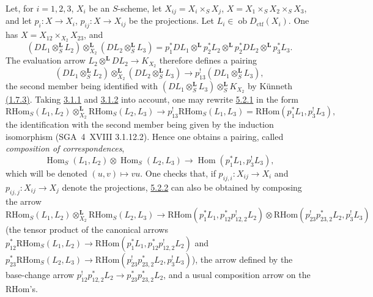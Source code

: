 \documentclass[11pt]{article}
\DeclareMathOperator{\Hom}{Hom}
\providecommand{\RHom}{\mathrm{RHom}}
\providecommand{\RHom}{\mathrm{RHom}}
\providecommand{\Hom}{\operatorname{Hom}}
\providecommand{\RHom}{\mathrm R\mathcal{H}om}
\providecommand{\RHom}{\mathrm{RHom}}
\providecommand{\Hom}{\operatorname{Hom}}
\begin{document}
Let, for $i=1,2,3$, $X_i$ be an $S$-scheme, let $X_{ij}=X_i\times_SX_j$, $X=X_1\times_SX_2\times_SX_3$, and let $p_i:X\to X_i$, $p_{ij}:X\to X_{ij}$ be the projections. Let $L_i\in\operatorname{ob}D_{\mathrm{ctf}}(X_i)$. One has $X=X_{12}\times_{X_2}X_{23}$, and
\[
(DL_1\otimes_S^{\mathbf L}L_2)\otimes_{X_2}^{\mathbf L}(DL_2\otimes_S^{\mathbf L}L_3)
=p_1^*DL_1\otimes^{\mathbf L}p_2^*L_2\otimes^{\mathbf L}p_2^*DL_2\otimes^{\mathbf L}p_3^*L_3.
\]
The evaluation arrow $L_2\otimes^{\mathbf L}DL_2\to K_{X_2}$ therefore defines a pairing
\begin{equation}
\tag{5.2.1}\label{sga5:III:equation:5.2.1}
(DL_1\otimes_S^{\mathbf L}L_2)\otimes_{X_2}^{\mathbf L}(DL_2\otimes_S^{\mathbf L}L_3)\longrightarrow p_{13}^!(DL_1\otimes_S^{\mathbf L}L_3),
\end{equation}
the second member being identified with $(DL_1\otimes_S^{\mathbf L}L_3)\otimes_S^{\mathbf L}K_{X_2}$ by Künneth \hyperref[sga5:III:equation:1.7.3]{(1.7.3)}. Taking \hyperref[sga5:III:equation:3.1.1]{3.1.1} and \hyperref[sga5:III:equation:3.1.2]{3.1.2} into account, one may rewrite \hyperref[sga5:III:equation:5.2.1]{5.2.1} in the form
\begin{equation}
\tag{5.2.2}\label{sga5:III:equation:5.2.2}
\RHom_S(L_1,L_2)\otimes_{X_2}^{\mathbf L}\RHom_S(L_2,L_3)\longrightarrow p_{13}^!\RHom_S(L_1,L_3)=\RHom(p_1^*L_1,p_3^!L_3),
\end{equation}
the identification with the second member being given by the induction isomorphism (SGA~4~XVIII 3.1.12.2). Hence one obtains a pairing, called \emph{composition of correspondences},
\begin{equation}
\tag{5.2.3}\label{sga5:III:equation:5.2.3}
\Hom_S(L_1,L_2)\otimes\Hom_S(L_2,L_3)\longrightarrow\Hom(p_1^*L_1,p_3^!L_3),
\end{equation}
which will be denoted $(u,v)\mapsto vu$. One checks that, if $p_{ij,i}:X_{ij}\to X_i$ and $p_{ij,j}:X_{ij}\to X_j$ denote the projections, \hyperref[sga5:III:equation:5.2.2]{5.2.2} can also be obtained by composing the arrow
\[
\RHom_S(L_1,L_2)\otimes_{X_2}^{\mathbf L}\RHom_S(L_2,L_3)
\longrightarrow
\RHom(p_1^*L_1,p_{12}^*p_{12,2}^!L_2)
\otimes
\RHom(p_{23}^!p_{23,2}^*L_2,p_3^!L_3)
\]
(the tensor product of the canonical arrows $p_{12}^*\RHom_S(L_1,L_2)\to\RHom(p_1^*L_1,p_{12}^*p_{12,2}^!L_2)$ and $p_{23}^*\RHom_S(L_2,L_3)\to\RHom(p_{23}^!p_{23,2}^*L_2,p_3^!L_3)$), the arrow defined by the base-change arrow $p_{12}^!p_{12,2}^*L_2\to p_{23}^*p_{23,2}^*L_2$, and a usual composition arrow on the $\RHom$'s.
\end{document}
